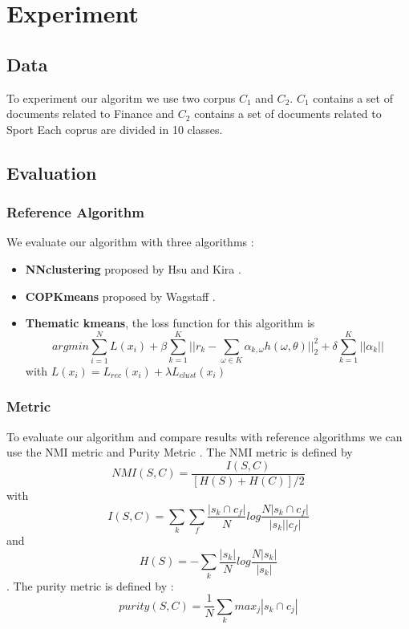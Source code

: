 \section{Experiment}

\subsection{Data}
To experiment our algoritm we use two corpus $C_1$ and $C_2$. $C_1$ contains a
set of documents related to Finance and $C_2$ contains a set of documents
related to Sport Each coprus are divided in 10 classes.

\subsection{Evaluation}
\subsubsection{Reference Algorithm}
We evaluate our algorithm with three algorithms :
\begin{itemize}
\item \textbf{NNclustering} proposed by Hsu and Kira
\cite{2015arXiv151106321H}.
\item \textbf{COPKmeans} proposed by Wagstaff \cite{Wagstaff:2001:CKC:645530.655669}.
\item \textbf{Thematic kmeans}, the loss function for this algorithm is
  \begin{equation*}
    argmin \sum_{i=1}^{N}L(x_i) + \beta\sum_{k=1}^{K}||r_k - \sum_{\omega \in K}
    \alpha_{k,\omega}h(\omega, \theta)||_2^2 + \delta\sum_{k=1}^{K}||\alpha_k|| 
  \end{equation*}
  with $L(x_i) = L_{rec}(x_i) + \lambda L_{clust}(x_i)$
\end{itemize}
\subsubsection{Metric}
To evaluate our algorithm and compare results with reference algorithms we can
use the NMI metric and Purity Metric \cite{measure}. The NMI metric is defined by
$$
NMI(S,C) = \frac{I(S,C)}{[H(S)+H(C)]/2}
$$ 
with
$$
I(S,C) =\sum_k \sum_f\frac{|s_k \cap c_f|}{N}log\frac{N|s_k \cap c_f|}{|s_k| |c_f|}
$$
and 
$$
H(S) = -\sum_k\frac{|s_k|}{N}log\frac{N|s_k|}{|s_k|}
$$.
The purity metric is defined by :
$$
purity(S,C) = \frac{1}{N}\sum_k {max}_j|s_k \cap c_j|
$$
